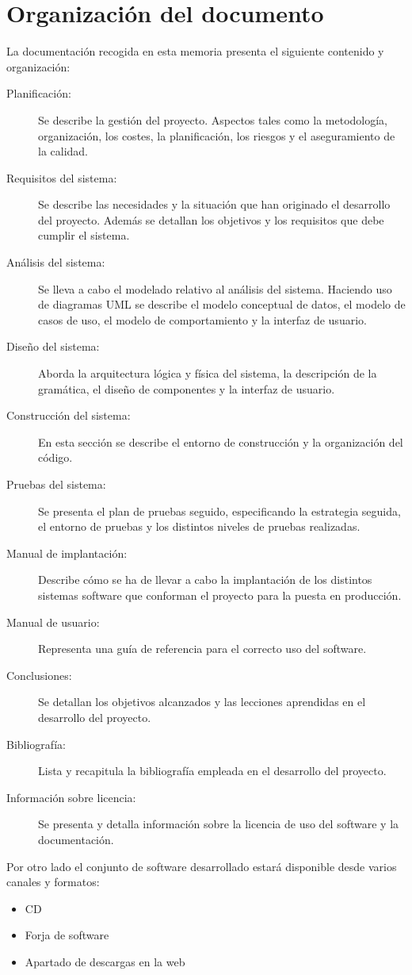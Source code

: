\section{Organización del documento}
La documentación recogida en esta memoria presenta el siguiente contenido y organización:

\begin {description}
\item [Planificación:] Se describe la gestión del proyecto. Aspectos tales como la metodología, organización, 
los costes, la planificación, los riesgos y el aseguramiento de la calidad. 
\item [Requisitos del sistema:] Se describe las necesidades y la situación que han originado el desarrollo del proyecto. Además 
se detallan los objetivos y los requisitos que debe cumplir el sistema. 
\item [Análisis del sistema:] Se lleva a cabo el modelado  relativo al análisis del sistema. Haciendo uso de diagramas UML se 
describe el modelo conceptual de datos, el modelo de casos de uso, el modelo de comportamiento y la interfaz de usuario. 
\item [Diseño del sistema:] Aborda la arquitectura lógica y física del sistema, la descripción de la gramática, el diseño de componentes y la
interfaz de usuario.
\item [Construcción del sistema:] En esta sección se describe el entorno de construcción y la organización del código.
\item [Pruebas del sistema:] Se presenta el plan de pruebas seguido, especificando la estrategia seguida, el entorno de pruebas y los distintos
niveles de pruebas realizadas.
\item [Manual de implantación:] Describe cómo se ha de llevar a cabo la implantación de los distintos sistemas software que 
conforman el proyecto para la puesta en producción. 
\item [Manual de usuario:] Representa una guía de referencia para el correcto uso del software.
\item [Conclusiones:] Se detallan los objetivos alcanzados y las lecciones aprendidas en el desarrollo del proyecto.
\item [Bibliografía:] Lista y recapitula la bibliografía empleada en el desarrollo del proyecto.
\item [Información sobre licencia:] Se presenta y detalla información sobre la licencia de uso del software y la documentación.
\end{description}

Por otro lado el conjunto de software desarrollado estará disponible desde varios canales y formatos:
\begin{itemize}
\item CD 
\item Forja de software
\item Apartado de descargas en la web
\end{itemize}

   
